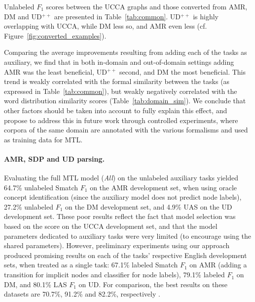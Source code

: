 \documentclass[11pt,a4paper]{article}
\begin{document}
Unlabeled $F_1$ scores between the UCCA graphs and those converted from AMR, DM and UD$^{++}$
are presented in Table~\ref{tab:common}.
UD$^{++}$ is highly overlapping with UCCA, while DM less so, and AMR even less
(cf. Figure~\ref{fig:converted_examples}). 

Comparing the average improvements resulting from adding each of the tasks as auxiliary, we find that 
in both in-domain and out-of-domain settings adding AMR was the least beneficial, UD$^{++}$ second,
and DM the most beneficial. This trend is weakly correlated with the formal similarity between the tasks
(as expressed in Table~\ref{tab:common}), but weakly negatively correlated with the word distribution similarity scores (Table~\ref{tab:domain_sim}).
We conclude that other factors should be taken into account to fully explain this effect,
and propose to address this in future work through controlled experiments, where corpora of the same
domain are annotated with the various formalisms and used as training data for MTL.



\paragraph{AMR, SDP and UD parsing.} 
Evaluating the full MTL model (\textit{All}) on the unlabeled auxiliary tasks yielded
64.7\% unlabeled Smatch $F_1$ \cite{cai2013smatch} on the AMR development set,
when using oracle concept identification
(since the auxiliary model does not predict node labels),
27.2\% unlabeled $F_1$ on the DM development set,
and 4.9\% UAS on the UD development set.
These poor results reflect the fact that model selection was based on the score
on the UCCA development set, and that the model parameters dedicated to auxiliary tasks were
very limited (to encourage using the shared parameters).
However, preliminary experiments using our approach produced
promising results on each of the tasks' respective English development sets,
when treated as a single task:
67.1\% labeled Smatch $F_1$ on AMR
(adding a transition for implicit nodes and classifier for node labels),
79.1\% labeled $F_1$ on DM,
and 80.1\% LAS $F_1$ on UD.
For comparison, the best results on these datasets are 70.7\%, 91.2\% and 82.2\%, respectively
\cite{foland2017abstract,Peng-EtAl:2018:NAACL,K17-3002}.
\end{document}
